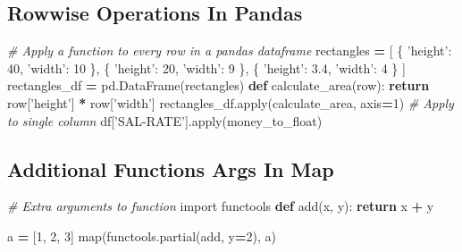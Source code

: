 \documentclass[]{book}
\newenvironment{Shaded}{\begin{snugshade}}{\end{snugshade}}
\newcommand{\KeywordTok}[1]{\textcolor[rgb]{0.13,0.29,0.53}{\textbf{#1}}}
\newcommand{\DecValTok}[1]{\textcolor[rgb]{0.00,0.00,0.81}{#1}}
\newcommand{\FloatTok}[1]{\textcolor[rgb]{0.00,0.00,0.81}{#1}}
\newcommand{\StringTok}[1]{\textcolor[rgb]{0.31,0.60,0.02}{#1}}
\newcommand{\ImportTok}[1]{#1}
\newcommand{\CommentTok}[1]{\textcolor[rgb]{0.56,0.35,0.01}{\textit{#1}}}
\newcommand{\ControlFlowTok}[1]{\textcolor[rgb]{0.13,0.29,0.53}{\textbf{#1}}}
\newcommand{\OperatorTok}[1]{\textcolor[rgb]{0.81,0.36,0.00}{\textbf{#1}}}
\newcommand{\BuiltInTok}[1]{#1}
\newcommand{\NormalTok}[1]{#1}
\theoremstyle{definition}
\theoremstyle{definition}
\theoremstyle{definition}
\theoremstyle{remark}
\begin{document}
\subsection{Rowwise Operations In
Pandas}\label{rowwise-operations-in-pandas}

\begin{Shaded}
\begin{Highlighting}[]
\CommentTok{# Apply a function to every row in a pandas dataframe}
\NormalTok{rectangles }\OperatorTok{=}\NormalTok{ [}
\NormalTok{    \{ }\StringTok{'height'}\NormalTok{: }\DecValTok{40}\NormalTok{, }\StringTok{'width'}\NormalTok{: }\DecValTok{10}\NormalTok{ \},}
\NormalTok{    \{ }\StringTok{'height'}\NormalTok{: }\DecValTok{20}\NormalTok{, }\StringTok{'width'}\NormalTok{: }\DecValTok{9}\NormalTok{ \},}
\NormalTok{    \{ }\StringTok{'height'}\NormalTok{: }\FloatTok{3.4}\NormalTok{, }\StringTok{'width'}\NormalTok{: }\DecValTok{4}\NormalTok{ \}}
\NormalTok{]}
\NormalTok{rectangles_df }\OperatorTok{=}\NormalTok{ pd.DataFrame(rectangles)}
\KeywordTok{def}\NormalTok{ calculate_area(row):}
    \ControlFlowTok{return}\NormalTok{ row[}\StringTok{'height'}\NormalTok{] }\OperatorTok{*}\NormalTok{ row[}\StringTok{'width'}\NormalTok{]}
\NormalTok{rectangles_df.}\BuiltInTok{apply}\NormalTok{(calculate_area, axis}\OperatorTok{=}\DecValTok{1}\NormalTok{)}
\CommentTok{# Apply to single column}
\NormalTok{df[}\StringTok{'SAL-RATE'}\NormalTok{].}\BuiltInTok{apply}\NormalTok{(money_to_float)}
\end{Highlighting}
\end{Shaded}

\subsection{Additional Functions Args In
Map}\label{additional-functions-args-in-map}

\begin{Shaded}
\begin{Highlighting}[]
\CommentTok{# Extra arguments to function}
\ImportTok{import}\NormalTok{ functools}
\KeywordTok{def}\NormalTok{ add(x, y):}
    \ControlFlowTok{return}\NormalTok{ x }\OperatorTok{+}\NormalTok{ y}
    
\NormalTok{a }\OperatorTok{=}\NormalTok{ [}\DecValTok{1}\NormalTok{, }\DecValTok{2}\NormalTok{, }\DecValTok{3}\NormalTok{]}
\BuiltInTok{map}\NormalTok{(functools.partial(add, y}\OperatorTok{=}\DecValTok{2}\NormalTok{), a)}
\end{Highlighting}
\end{Shaded}
\end{document}

